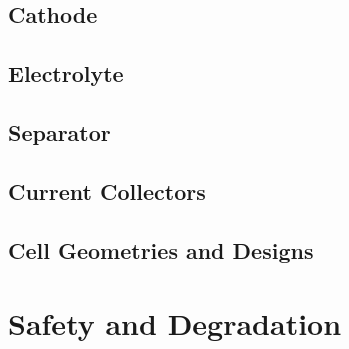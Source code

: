 \subsection{Cathode}
\label{sec:cathode}

\subsection{Electrolyte}
\label{sec:electrolyte}

\subsection{Separator}
\label{sec:separator}

\subsection{Current Collectors}
\label{sec:current-collectors}

\subsection{Cell Geometries and Designs}
\label{sec:cell-geometries-designs}

\section{Safety and Degradation}
\label{sec:safety-degradation}
